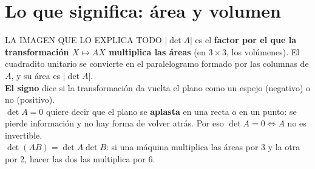 \section{Lo que significa: área y volumen}
\begin{tip}{LA IMAGEN QUE LO EXPLICA TODO}
$|\det A|$ es el \textbf{factor por el que la transformación $X\mapsto AX$ multiplica las áreas} (en $3\times3$, los volúmenes). El cuadradito unitario se convierte en el paralelogramo formado por las columnas de $A$, y su área es $|\det A|$.\\[2pt]
\textbf{El signo} dice si la transformación da vuelta el plano como un espejo (negativo) o no (positivo).\\[2pt]
\textbf{$\det A=0$} quiere decir que el plano se \textbf{aplasta} en una recta o en un punto: se pierde información y no hay forma de volver atrás. Por eso $\det A=0\iff A$ no es invertible.\\[2pt]
$\det(AB)=\det A\det B$: si una máquina multiplica las áreas por 3 y la otra por 2, hacer las dos las multiplica por 6.
\end{tip}
\begin{center}
\end{center}

